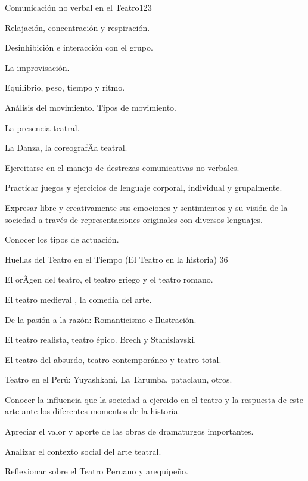\begin{syllabus}
\begin{unit}{Comunicación no verbal en el Teatro}{}{12}{3}
\begin{topics}
	\item Relajación, concentración y respiración.
	\item Desinhibición e interacción con el grupo.
	\item La improvisación. 
	\item Equilibrio, peso, tiempo y ritmo. 
	\item Análisis del movimiento. Tipos de movimiento.
	\item La presencia teatral.
	\item La Danza, la coreografÃ­a teatral.     

\end{topics}
\begin{unitgoals}
	\item Ejercitarse en el manejo de destrezas comunicativas no verbales.
	\item Practicar juegos y ejercicios de lenguaje  corporal, individual y grupalmente.
	\item Expresar libre y creativamente sus emociones y sentimientos y su visión de la sociedad  a través de representaciones originales con diversos lenguajes. 
	\item Conocer los tipos de actuación.
\end{unitgoals}
\end{unit}

\begin{unit}{Huellas del Teatro en el Tiempo  (El Teatro en la historia) }{}{3}{6}
\begin{topics}
	\item El orÃ­gen del teatro, el teatro griego y el teatro romano.
	\item El teatro medieval , la comedia del arte.
	\item De la pasión a la razón: Romanticismo e Ilustración.
	\item El teatro realista, teatro épico. Brech  y  Stanislavski.
	\item El teatro del absurdo, teatro contemporáneo y teatro total.
	\item Teatro en el Perú: Yuyashkani, La Tarumba, pataclaun, otros.
\end{topics}
\begin{unitgoals}
	\item Conocer la influencia que la sociedad a ejercido en el teatro y la respuesta de este arte ante los diferentes momentos de la historia.
	\item Apreciar el valor y aporte de las obras de dramaturgos importantes. 
	\item Analizar el contexto social del arte teatral.
	\item Reflexionar sobre el Teatro Peruano y arequipeño.
\end{unitgoals}
\end{unit}


\end{syllabus}
